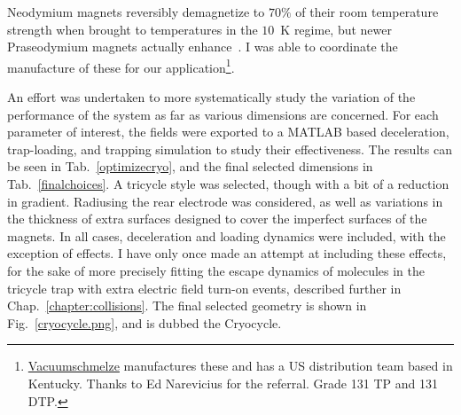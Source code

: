 Neodymium magnets reversibly demagnetize to $70\%$ of their room temperature strength when brought to temperatures in the $10$~K regime, but newer Praseodymium magnets actually enhance~\cite{Shea2010}.
I was able to coordinate the manufacture of these for our application\footnote{\href{https://www.vacuumschmelze.com}{Vacuumschmelze} manufactures these and has a US distribution team based in Kentucky. Thanks to Ed Narevicius for the referral. Grade 131 TP and 131 DTP.}.

An effort was undertaken to more systematically study the variation of the performance of the system as far as various dimensions are concerned.
For each parameter of interest, the fields were exported to a MATLAB based deceleration, trap-loading, and trapping simulation to study their effectiveness.
The results can be seen in Tab.~\ref{optimizecryo}, and the final selected dimensions in Tab.~\ref{finalchoices}.
A tricycle style was selected, though with a bit of a reduction in gradient.
Radiusing the rear electrode was considered, as well as variations in the thickness of extra surfaces designed to cover the imperfect surfaces of the magnets.
In all cases, deceleration and loading dynamics were included, with the exception of  effects.
I have only once made an attempt at including these effects, for the sake of more precisely fitting the escape dynamics of molecules in the tricycle trap with extra electric field turn-on events, described further in Chap.~\ref{chapter:collisions}.
The final selected geometry is shown in Fig.~\ref{cryocycle.png}, and is dubbed the Cryocycle.

